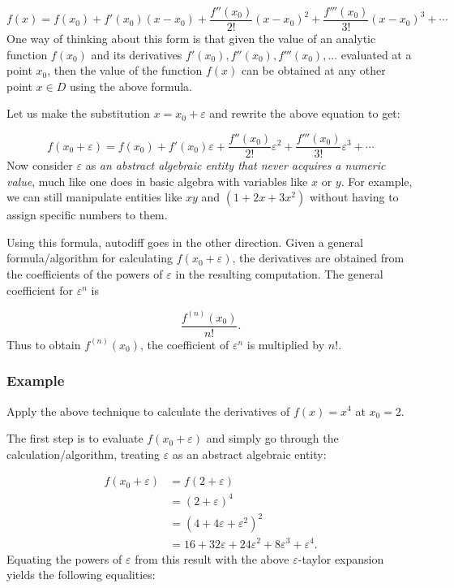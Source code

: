 \documentclass{article}
\begin{document}
\[
f(x) = f(x_0) + f'(x_0)(x-x_0) + \frac{f''(x_0)}{2!}(x-x_0)^2 + \frac{f'''(x_0)}{3!}(x-x_0)^3 + \cdots
\]
One way of thinking about this form is that given the value of an analytic function $f(x_0)$ and its derivatives
$f'(x_0), f''(x_0), f'''(x_0), ...$ evaluated at a point $x_0$, then the value of the function
$f(x)$ can be obtained at any other point $x\in D$ using the above formula.

Let us make the substitution $x=x_0+\varepsilon$ and rewrite the above equation to get:

\[
f(x_0+\varepsilon) = f(x_0) + f'(x_0)\varepsilon + \frac{f''(x_0)}{2!}\varepsilon^2 + \frac{f'''(x_0)}{3!}\varepsilon^3 + \cdots
\]
Now consider $\varepsilon$ as {\it an abstract algebraic entity that never acquires a numeric value}, much like
one does in basic algebra with variables like $x$ or $y$. For example, we can still manipulate entities
like $xy$ and $(1+2x+3x^2)$ without having to assign specific numbers to them.

Using this formula, autodiff goes in the other direction. Given a general formula/algorithm for calculating
$f(x_0+\varepsilon)$, the derivatives are obtained from the coefficients of the powers of $\varepsilon$
in the resulting computation. The general coefficient for $\varepsilon^n$ is

\[\frac{f^{(n)}(x_0)}{n!}.\]
Thus to obtain $f^{(n)}(x_0)$, the coefficient of $\varepsilon^n$ is multiplied by $n!$.

\subsubsection{Example}

Apply the above technique to calculate the derivatives of $f(x)=x^4$ at $x_0=2$.

The first step is to evaluate $f(x_0+\varepsilon)$ and simply go through the calculation/algorithm, treating
$\varepsilon$ as an abstract algebraic entity:

\begin{align*}
f(x_0+\varepsilon) &= f(2+\varepsilon) \\
 &= (2+\varepsilon)^4 \\
 &= \left(4+4\varepsilon+\varepsilon^2\right)^2 \\
 &= 16+32\varepsilon+24\varepsilon^2+8\varepsilon^3+\varepsilon^4.
\end{align*}
Equating the powers of $\varepsilon$ from this result with the above $\varepsilon$-taylor expansion
yields the following equalities:
\end{document}
